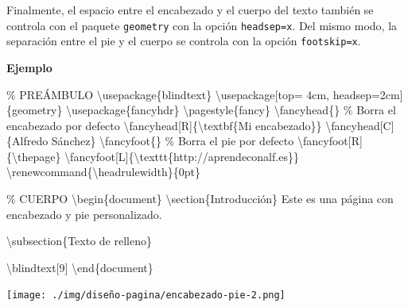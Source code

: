 \documentclass[
  a4paper,
]{scrreport}
\newenvironment{Shaded}{\begin{snugshade}}{\end{snugshade}}
\newcommand{\BuiltInTok}[1]{\textcolor[rgb]{0.00,0.23,0.31}{#1}}
\newcommand{\CommentTok}[1]{\textcolor[rgb]{0.37,0.37,0.37}{#1}}
\newcommand{\ExtensionTok}[1]{\textcolor[rgb]{0.00,0.23,0.31}{#1}}
\newcommand{\FunctionTok}[1]{\textcolor[rgb]{0.28,0.35,0.67}{#1}}
\newcommand{\KeywordTok}[1]{\textcolor[rgb]{0.00,0.23,0.31}{#1}}
\newcommand{\NormalTok}[1]{\textcolor[rgb]{0.00,0.23,0.31}{#1}}
\begin{document}
Finalmente, el espacio entre el encabezado y el cuerpo del texto también
se controla con el paquete \texttt{geometry} con la opción
\texttt{headsep=x}. Del mismo modo, la separación entre el pie y el
cuerpo se controla con la opción \texttt{footskip=x}.

\textbf{Ejemplo}

\begin{Shaded}
\begin{Highlighting}[]
\CommentTok{\% PREÁMBULO}
\BuiltInTok{\textbackslash{}usepackage}\NormalTok{\{}\ExtensionTok{blindtext}\NormalTok{\}}
\BuiltInTok{\textbackslash{}usepackage}\NormalTok{[top= 4cm, headsep=2cm]\{}\ExtensionTok{geometry}\NormalTok{\}}
\BuiltInTok{\textbackslash{}usepackage}\NormalTok{\{}\ExtensionTok{fancyhdr}\NormalTok{\}}
\FunctionTok{\textbackslash{}pagestyle}\NormalTok{\{fancy\}}
\FunctionTok{\textbackslash{}fancyhead}\NormalTok{\{\} }\CommentTok{\% Borra el encabezado por defecto}
\FunctionTok{\textbackslash{}fancyhead}\NormalTok{[R]\{}\FunctionTok{\textbackslash{}textbf}\NormalTok{\{Mi encabezado\}\}}
\FunctionTok{\textbackslash{}fancyhead}\NormalTok{[C]\{Alfredo Sánchez\}}
\FunctionTok{\textbackslash{}fancyfoot}\NormalTok{\{\} }\CommentTok{\% Borra el pie por defecto}
\FunctionTok{\textbackslash{}fancyfoot}\NormalTok{[R]\{}\FunctionTok{\textbackslash{}thepage}\NormalTok{\}}
\FunctionTok{\textbackslash{}fancyfoot}\NormalTok{[L]\{}\FunctionTok{\textbackslash{}texttt}\NormalTok{\{http://aprendeconalf.es\}\}}
\FunctionTok{\textbackslash{}renewcommand}\NormalTok{\{}\ExtensionTok{\textbackslash{}headrulewidth}\NormalTok{\}\{0pt\}}

\CommentTok{\% CUERPO}
\KeywordTok{\textbackslash{}begin}\NormalTok{\{}\ExtensionTok{document}\NormalTok{\}}
\KeywordTok{\textbackslash{}section}\NormalTok{\{Introducción\}}
\NormalTok{Este es una página con encabezado y pie personalizado.}

\KeywordTok{\textbackslash{}subsection}\NormalTok{\{Texto de relleno\}}

\FunctionTok{\textbackslash{}blindtext}\NormalTok{[9]}
\KeywordTok{\textbackslash{}end}\NormalTok{\{}\ExtensionTok{document}\NormalTok{\}}
\end{Highlighting}
\end{Shaded}

\begin{tcolorbox}[enhanced jigsaw, bottomrule=.15mm, leftrule=.75mm, opacityback=0, titlerule=0mm, bottomtitle=1mm, colbacktitle=quarto-callout-note-color!10!white, arc=.35mm, toprule=.15mm, colframe=quarto-callout-note-color-frame, title={Salida}, coltitle=black, colback=white, breakable, toptitle=1mm, rightrule=.15mm, left=2mm, opacitybacktitle=0.6]

\texttt{[image: ./img/diseño-pagina/encabezado-pie-2.png]}

\end{tcolorbox}
\end{document}
